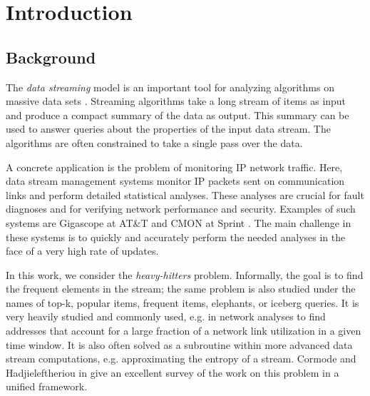 \documentclass[sigconf,review=true,anonymous=true,screen]{acmart}
\begin{document}

%

%

%
\maketitle

\section{Introduction}
\subsection{Background}
The {\em data streaming} model is an important tool for analyzing algorithms on massive data sets \cite{Muthu05}. Streaming algorithms
take a long stream of items as input and produce a compact summary of the data as output. This summary can be used to answer queries about the properties of the input data stream. The algorithms are often constrained to take a single pass over the data.

A concrete application is the problem of monitoring IP network traffic. Here, data stream management systems monitor IP packets sent on communication links and perform detailed statistical analyses. These analyses are crucial for fault diagnoses and for verifying network performance and security. Examples of such systems are Gigascope at AT\&T \cite{Giga} and CMON at Sprint \cite{CMON}. The main challenge in these systems is to quickly and accurately perform the needed analyses in the face of a very high rate of updates.


In this work, we consider the {\em heavy-hitters} problem. Informally, the goal is to find the frequent elements in the stream; the same problem is also studied under the names of top-k, popular items, frequent items, elephants, or iceberg queries. It is very heavily studied and commonly used, e.g. in network analyses to find addresses that account for a large fraction of a network link utilization in a given time window. It is also often solved as a subroutine within more advanced data stream computations, e.g. approximating the entropy of a stream. Cormode and Hadjieleftheriou in \cite{FrequentSurvey} give an excellent survey of the work on this problem in a unified framework. 
\end{document}
